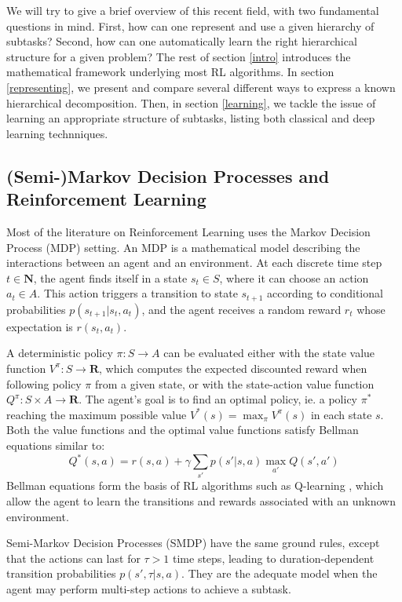 \documentclass{article}
\newcommand{\Nn}{\mathbf{N}}
\newcommand{\Rr}{\mathbf{R}}
\begin{document}
We will try to give a brief overview of this recent field, with two fundamental questions in mind. First, how can one represent and use a given hierarchy of subtasks?
Second, how can one automatically learn the right hierarchical structure for a given problem? 
The rest of section \ref{intro} introduces the mathematical framework underlying most RL algorithms. In section \ref{representing}, we present and compare several different ways to express a known hierarchical decomposition. Then, in section \ref{learning}, we tackle the issue of learning an appropriate structure of subtasks, listing both classical and deep learning technniques.

\subsection{(Semi-)Markov Decision Processes and Reinforcement Learning}

Most of the literature on Reinforcement Learning uses the Markov Decision Process (MDP) setting. An MDP is a mathematical model describing the interactions between an agent and an environment. At each discrete time step $t \in \Nn$, the agent finds itself in a state $s_t \in S$, where it can choose an action $a_t \in A$. This action triggers a transition to state $s_{t+1}$ according to conditional probabilities $p(s_{t+1} | s_t, a_t)$, and the agent receives a random reward $r_t$ whose expectation is $r(s_t, a_t)$.

A deterministic policy $\pi: S \to A$ can be evaluated either with the state value function $V^{\pi}: S \to \Rr$, which computes the expected discounted reward when following policy $\pi$ from a given state, or with the state-action value function $Q^{\pi}: S \times A \to \Rr$. The agent's goal is to find an optimal policy, ie. a policy $\pi^*$ reaching the maximum possible value $V^*(s) = \max_{\pi} V^{\pi}(s)$ in each state $s$. Both the value functions and the optimal value functions satisfy Bellman equations similar to:
\begin{equation}
    Q^* (s, a) = r(s, a) + \gamma \sum_{s'}{p(s' | s, a) \max_{a'}{Q(s', a')}}
\end{equation}
Bellman equations form the basis of RL algorithms such as Q-learning \cite{watkins_q-learning_1992}, which allow the agent to learn the transitions and rewards associated with an unknown environment.

Semi-Markov Decision Processes (SMDP) have the same ground rules, except that the actions can last for $\tau > 1$ time steps, leading to duration-dependent transition probabilities $p(s', \tau | s, a)$. They are the adequate model when the agent may perform multi-step actions to achieve a subtask.
\end{document}
